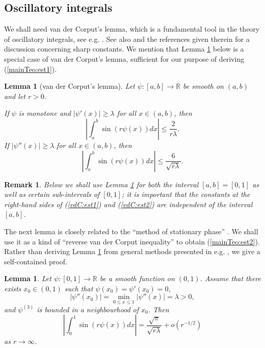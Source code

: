 \documentclass{amsart}
\newtheorem{lem}[theorem]{Lemma}
\newtheorem{rem}[theorem]{Remark}
\numberwithin{equation}{section}
\begin{document}
\subsection{Oscillatory integrals}
We shall need van der Corput's lemma, which is a fundamental tool in the theory of oscillatory integrals, see e.g. \cite[Chapter VIII, §1.2]{Stein}. See also \cite{Rogers} and the references given therein for a discussion concerning sharp constants. We mention that Lemma \ref{vdCLemma} below is a special case of van der Corput's lemma, sufficient for our purpose of deriving (\ref{mainTeo:est1}).
\begin{lem}[van der Corput's lemma]
\label{vdCLemma}
Let $\psi:[a,b]\rightarrow\mathbb{R}$ be smooth on $(a,b)$ and let $r>0$.

If $\psi$ is monotone and $|\psi'(x)|\ge\lambda$ for all $x\in(a,b)$, then 
    \begin{equation}
        \label{vdC:est1}
        \left|\int_a^b\sin(r\psi(x))dx\right|\le \frac{2}{r\lambda}.
    \end{equation}
If $|\psi''(x)|\ge\lambda$ for all $x\in(a,b)$, then
     \begin{equation}
        \label{vdC:est2}
        \left|\int_a^b\sin(r\psi(x))dx\right|\le \frac{6}{\sqrt{r\lambda}}.
    \end{equation}

\end{lem}
\begin{rem}
\label{intervalRemark}
Below we shall use Lemma \ref{vdCLemma} for both the interval $[a,b]=[0,1]$ as well as certain sub-intervals of $[0,1]$; it is important that the constants at the right-hand sides of  (\ref{vdC:est1}) and (\ref{vdC:est2}) are independent of the interval $[a,b]$.
\end{rem}
The next lemma is closely related to the ``method of stationary phase''  \cite[Chapter VIII, §1.3]{Stein}. We shall use it as a kind of ``reverse van der Corput inequality'' to obtain (\ref{mainTeo:est2}). 
Rather than deriving Lemma \ref{statPhaseLemma} from general methods presented in e.g. \cite{Stein}, we give a self-contained proof.
\begin{lem}
\label{statPhaseLemma}
Let $\psi:[0,1]\rightarrow\mathbb{R}$ be a smooth function on $(0,1)$. Assume that there exists $x_0\in(0,1)$ such that $\psi(x_0)=\psi'(x_0)=0$,
\begin{equation}
    \label{statPhaseLemmaCond}
    |\psi''(x_0)|=\min_{0\le x\le1}|\psi''(x)|=\lambda>0,
\end{equation}
and $\psi^{(3)}$ is bounded in a neighbourhood of $x_0$. Then
\begin{equation}
    \label{reverseVDC}
    \left|\int_0^1\sin(r\psi(x))dx\right|=\frac{\sqrt{\pi}}{\sqrt{r\lambda}}+o(r^{-1/2})
\end{equation}
as $r\rightarrow\infty$.
\end{lem}
\end{document}
